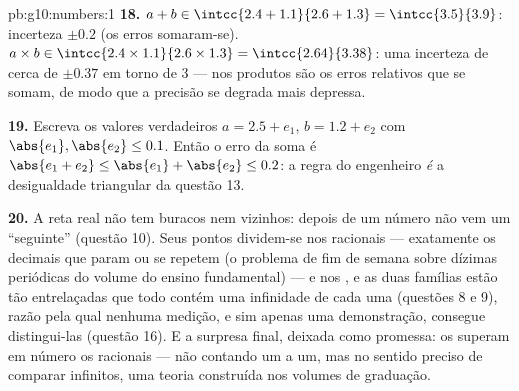 \begin{solution}{pb:g10:numbers:1}
\textbf{18.} $a + b \in \intcc{2.4 + 1.1}{2.6 + 1.3} =
\intcc{3.5}{3.9}$: incerteza $\pm 0.2$ (os erros somaram-se).
$a \times b \in \intcc{2.4 \times 1.1}{2.6 \times 1.3} =
\intcc{2.64}{3.38}$: uma incerteza de cerca de $\pm 0.37$ em
torno de $3$ --- nos produtos são os erros relativos que se
somam, de modo que a precisão se degrada mais depressa.

\textbf{19.} Escreva os valores verdadeiros $a = 2.5 + e_1$,
$b = 1.2 + e_2$ com $\abs{e_1}, \abs{e_2} \leq 0.1$. Então o
erro da soma é $\abs{e_1 + e_2} \leq \abs{e_1} + \abs{e_2}
\leq 0.2$: a regra do engenheiro \emph{é} a desigualdade
triangular da questão 13.

\textbf{20.} A reta real não tem buracos nem vizinhos: depois
de um número não vem um ``seguinte'' (questão 10). Seus pontos
dividem-se nos racionais --- exatamente os decimais que param
ou se repetem (o problema de fim de semana sobre dízimas
periódicas do volume do ensino fundamental) --- e nos
, e as duas famílias estão tão entrelaçadas que todo
 contém uma infinidade de cada uma (questões 8 e 9),
razão pela qual nenhuma medição, e sim apenas uma demonstração,
consegue distingui-las (questão 16). E a surpresa final,
deixada como promessa: os  superam em número os
racionais --- não contando um a um, mas no sentido preciso de
comparar infinitos, uma teoria construída nos volumes de
graduação.
\end{solution}
